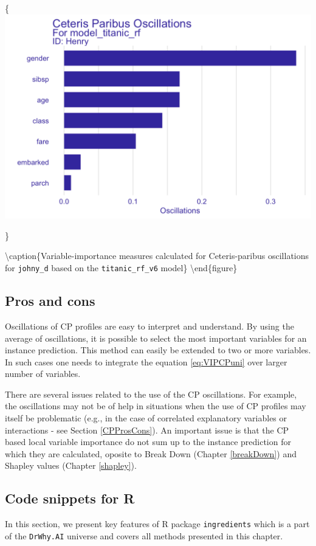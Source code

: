 \documentclass[12pt,]{krantz}
\begin{document}
\{\centering \includegraphics[width=0.65\linewidth]{figure/oscillations_all_rf_plot}

\}

\textbackslash{}caption\{Variable-importance measures calculated for Ceteris-paribus oscillations for \texttt{johny\_d} based on the \texttt{titanic\_rf\_v6} model\}\label{fig:CPVIP1}
\textbackslash{}end\{figure\}

\hypertarget{CPOscProsCons}{%
\subsection{Pros and cons}\label{CPOscProsCons}}

Oscillations of CP profiles are easy to interpret and understand. By using the average of oscillations, it is possible to select the most important variables for an instance prediction. This method can easily be extended to two or more variables. In such cases one needs to integrate the equation \eqref{eq:VIPCPuni} over larger number of variables.

There are several issues related to the use of the CP oscillations. For example, the oscillations may not be of help in situations when the use of CP profiles may itself be problematic (e.g., in the case of correlated explanatory variables or interactions - see Section \ref{CPProsCons}). An important issue is that the CP based local variable importance do not sum up to the instance prediction for which they are calculated, oposite to Break Down (Chapter \ref{breakDown}) and Shapley values (Chapter \ref{shapley}).

\hypertarget{CPOscR}{%
\subsection{Code snippets for R}\label{CPOscR}}

In this section, we present key features of R package \texttt{ingredients} which is a part of the \texttt{DrWhy.AI} universe and covers all methods presented in this chapter.
\end{document}
